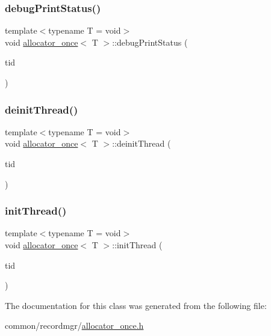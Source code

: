 \mbox{\label{classallocator__once_ad50c51979d7260a86334c3df79b3d55e}} 
\subsubsection{\texorpdfstring{debug\+Print\+Status()}{debugPrintStatus()}}
{\footnotesize\ttfamily template$<$typename T  = void$>$ \\
void \hyperlink{classallocator__once}{allocator\+\_\+once}$<$ T $>$\+::debug\+Print\+Status (\begin{DoxyParamCaption}\item[{const int}]{tid }\end{DoxyParamCaption})\hspace{0.3cm}{\ttfamily [inline]}}

\mbox{\label{classallocator__once_a8dd2989cbd49008d5faa43d03c930e0e}} 
\subsubsection{\texorpdfstring{deinit\+Thread()}{deinitThread()}}
{\footnotesize\ttfamily template$<$typename T  = void$>$ \\
void \hyperlink{classallocator__once}{allocator\+\_\+once}$<$ T $>$\+::deinit\+Thread (\begin{DoxyParamCaption}\item[{const int}]{tid }\end{DoxyParamCaption})\hspace{0.3cm}{\ttfamily [inline]}}

\mbox{\label{classallocator__once_a700c4f8c603d07b26435da98425e2cb8}} 
\subsubsection{\texorpdfstring{init\+Thread()}{initThread()}}
{\footnotesize\ttfamily template$<$typename T  = void$>$ \\
void \hyperlink{classallocator__once}{allocator\+\_\+once}$<$ T $>$\+::init\+Thread (\begin{DoxyParamCaption}\item[{const int}]{tid }\end{DoxyParamCaption})\hspace{0.3cm}{\ttfamily [inline]}}



The documentation for this class was generated from the following file\+:\begin{DoxyCompactItemize}
\item 
common/recordmgr/\hyperlink{allocator__once_8h}{allocator\+\_\+once.\+h}\end{DoxyCompactItemize}
